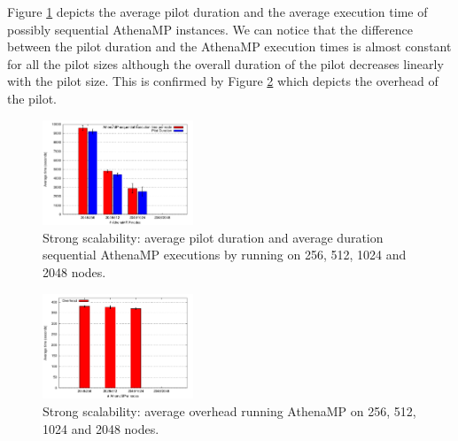 Figure \ref{fig:strongScala} depicts the average pilot duration and  the average execution time of possibly sequential AthenaMP instances.  We can notice that the difference between the pilot duration and the AthenaMP execution times is almost constant for all the pilot sizes although the overall duration of the pilot decreases linearly with the pilot size. This is confirmed by Figure \ref{fig:strongScalb} which depicts the overhead of the pilot.  

\begin{figure}[!htb]
        \includegraphics[width=0.4\textwidth]{./figures/NGE/strongET.pdf}
    \caption{Strong scalability: average pilot duration and average duration sequential AthenaMP executions by running on 256, 512, 1024 and 2048 nodes.}
\label{fig:strongScala}
\end{figure}




\begin{figure}[!htb]
        \includegraphics[width=0.4\textwidth]{./figures/NGE/strongOver.pdf}
    \caption{Strong scalability: average overhead running AthenaMP on 256, 512, 1024 and 2048 nodes.}
\label{fig:strongScalb}
\end{figure}

 
%
%

